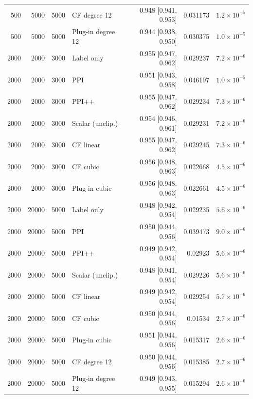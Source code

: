 {\begin{longtable}{rrrlrrr}
500 & 5000 & 5000 & CF degree 12 & 0.948 [0.941, 0.953] & 0.031173 & $1.2\times 10^{-5}$ \\
500 & 5000 & 5000 & Plug-in degree 12 & 0.944 [0.938, 0.950] & 0.030375 & $1.0\times 10^{-5}$ \\
2000 & 2000 & 3000 & Label only & 0.955 [0.947, 0.962] & 0.029237 & $7.2\times 10^{-6}$ \\
2000 & 2000 & 3000 & PPI & 0.951 [0.943, 0.958] & 0.046197 & $1.0\times 10^{-5}$ \\
2000 & 2000 & 3000 & PPI++ & 0.955 [0.947, 0.962] & 0.029234 & $7.3\times 10^{-6}$ \\
2000 & 2000 & 3000 & Scalar (unclip.) & 0.954 [0.946, 0.961] & 0.029231 & $7.2\times 10^{-6}$ \\
2000 & 2000 & 3000 & CF linear & 0.955 [0.947, 0.962] & 0.029245 & $7.3\times 10^{-6}$ \\
2000 & 2000 & 3000 & CF cubic & 0.956 [0.948, 0.963] & 0.022668 & $4.5\times 10^{-6}$ \\
2000 & 2000 & 3000 & Plug-in cubic & 0.956 [0.948, 0.963] & 0.022661 & $4.5\times 10^{-6}$ \\
2000 & 20000 & 5000 & Label only & 0.948 [0.942, 0.954] & 0.029235 & $5.6\times 10^{-6}$ \\
2000 & 20000 & 5000 & PPI & 0.950 [0.944, 0.956] & 0.039473 & $9.0\times 10^{-6}$ \\
2000 & 20000 & 5000 & PPI++ & 0.949 [0.942, 0.954] & 0.02923 & $5.6\times 10^{-6}$ \\
2000 & 20000 & 5000 & Scalar (unclip.) & 0.948 [0.941, 0.954] & 0.029226 & $5.6\times 10^{-6}$ \\
2000 & 20000 & 5000 & CF linear & 0.949 [0.942, 0.954] & 0.029254 & $5.7\times 10^{-6}$ \\
2000 & 20000 & 5000 & CF cubic & 0.950 [0.944, 0.956] & 0.01534 & $2.7\times 10^{-6}$ \\
2000 & 20000 & 5000 & Plug-in cubic & 0.951 [0.944, 0.956] & 0.015317 & $2.6\times 10^{-6}$ \\
2000 & 20000 & 5000 & CF degree 12 & 0.950 [0.944, 0.956] & 0.015385 & $2.7\times 10^{-6}$ \\
2000 & 20000 & 5000 & Plug-in degree 12 & 0.949 [0.943, 0.955] & 0.015294 & $2.6\times 10^{-6}$ \\
\end{longtable}}
